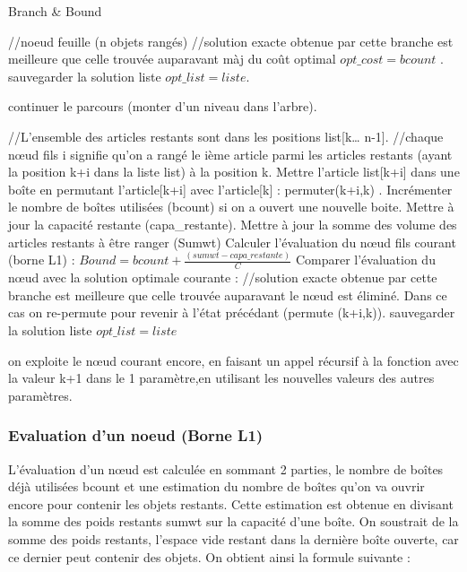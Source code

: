 \documentclass[12pt]{article}
\begin{document}
\begin{algorithm}[H]
    \caption{Branch \& Bound}
    \begin{algorithmic}
        \STATE //noeud feuille (n objets rangés)
            \STATE //solution exacte obtenue par cette branche est meilleure que celle trouvée auparavant
            \STATE màj du coût optimal $opt\_cost=bcount$ .
            \STATE sauvegarder la solution liste  $opt\_list=liste$. 
        
        \ELSE
            \STATE continuer le parcours (monter d’un niveau dans l’arbre).
       \ENDIF
        
    \ELSE

        \STATE //L’ensemble des articles restants sont dans les positions list[k… n-1].
        \STATE //chaque nœud fils i signifie qu’on a rangé le ième article parmi les articles restants (ayant la position k+i dans la liste list) à la position k.
            \STATE Mettre l’article list[k+i] dans une boîte en permutant l’article[k+i] avec l’article[k] : permuter(k+i,k) .
            \STATE Incrémenter le nombre de boîtes utilisées (bcount) si on a ouvert une nouvelle boite.
            \STATE Mettre à jour la capacité restante (capa\_restante).
            \STATE Mettre à jour la somme des volume des articles restants à être ranger (Sumwt)
            \STATE Calculer l’évaluation du nœud fils courant (borne L1) : $Bound=bcount+\frac{(sumwt-capa\_restante)}{C}$
            \STATE Comparer l’évaluation du nœud avec la solution optimale courante :
                \STATE //solution exacte obtenue par cette branche est meilleure que celle trouvée auparavant
                \STATE  le nœud est éliminé. Dans ce cas on re-permute pour revenir à l’état précédant (permute (k+i,k)). 
                \STATE sauvegarder la solution liste  $opt\_list=liste$ 
        
           \ELSE
                \STATE on exploite le nœud courant encore, en faisant un appel récursif à la fonction avec la valeur  k+1 dans le 1 paramètre,en utilisant les nouvelles valeurs des autres paramètres.
           \ENDIF


        \ENDFOR
    \ENDIF
    \end{algorithmic}
    \end{algorithm}
\subsubsection*{Evaluation d'un noeud (Borne L1)}
L’évaluation d’un nœud est calculée en sommant 2 parties, le nombre de boîtes déjà utilisées bcount et une estimation du nombre de boîtes qu’on va ouvrir encore pour contenir les objets restants. Cette estimation est obtenue en divisant la somme des poids restants sumwt sur la capacité d’une boîte. On soustrait de la somme des poids restants, l’espace vide 
restant dans la dernière boîte ouverte, car ce dernier peut contenir des objets. On obtient ainsi la formule suivante :  
\end{document}
